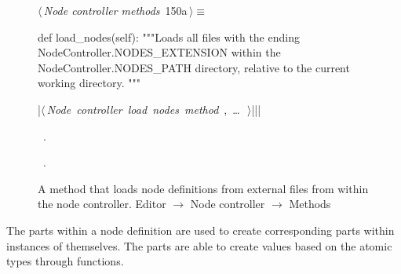 \documentclass[%
    a4paper,    %
    justified,  %
    nobib,      %
    openany     %
]{tufte-book}
\makeatletter
\renewcommand{\label}[1]{\@tufte@label{##1}}%
\makeatother
\begin{document}
\begin{figure}[!htbp]
\begin{flushleft} \small
\begin{minipage}{\linewidth}\label{scrap107}\raggedright\small
{} $\langle\,${\itshape Node controller methods}\nobreak\ {\footnotesize {150a}}$\,\rangle\equiv$
\vspace{-1ex}
\begin{pythoncode}
def load_nodes(self):
    """Loads all files with the ending
    NodeController.NODES_EXTENSION
    within the NodeController.NODES_PATH directory, relative to
    the current working directory.
    """

    |\hbox{$\langle\,${\itshape Node controller load nodes method}\nobreak\ {\footnotesize {}, \ldots\ }$\,\rangle$}||\NWsep|
\end{pythoncode}
\vspace{1.5ex}
\footnotesize
\begin{list}{}{\setlength{\itemsep}{-\parsep}\setlength{\itemindent}{-\leftmargin}}
\item \NWtxtMacroDefBy\ .
\item \NWtxtMacroRefIn\ .

\item{}
\end{list}
\end{minipage}\vspace{4ex}
\end{flushleft}
\caption{A method that loads node definitions from external files from within
  the node controller.
  \newline{}\newline{}Editor $\rightarrow$ Node controller $\rightarrow$
  Methods}
\end{figure}

 The parts within a node
definition are used to create corresponding parts within instances of
themselves. The parts are able to create values based on the atomic types
through functions.
\end{document}
